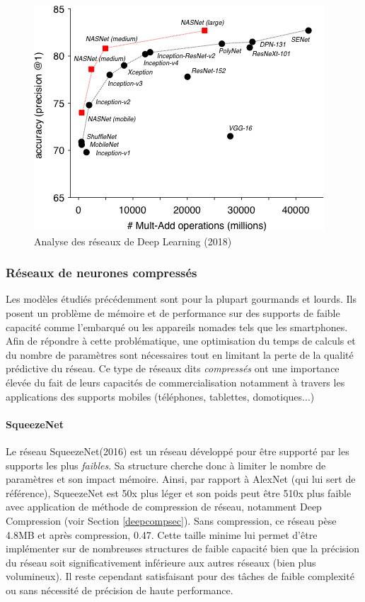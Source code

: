 \begin{figure}
    \centering
    \includegraphics[scale=0.45]{./tex/convolution-network/classifier/nasnet.jpg}
    \caption{Analyse des réseaux de Deep Learning (2018)}
    \label{ranking}
\end{figure}

\subsubsection{Réseaux de neurones compressés}

Les modèles étudiés précédemment sont pour la plupart gourmands et lourds. Ils posent un problème de mémoire et de performance sur des supports de faible capacité comme l'embarqué ou les appareils nomades tels que les smartphones. Afin de répondre à cette problématique, une optimisation du temps de calculs et du nombre de paramètres sont nécessaires tout en limitant la perte de la qualité prédictive du réseau. Ce type de réseaux dits \textit{compressés} ont une importance élevée du fait de leurs capacités de commercialisation notamment à travers les applications des supports mobiles (téléphones, tablettes, domotiques...)

\paragraph{SqueezeNet}
\label{squeezesect}
Le réseau SqueezeNet\cite{squeezenet}(2016) est un réseau développé pour être supporté par les supports les plus \textit{faibles}. Sa structure cherche donc à limiter le nombre de paramètres et son impact mémoire. Ainsi, par rapport à AlexNet (qui lui sert de référence), SqueezeNet est 50x plus léger et son poids peut être 510x plus faible avec application de méthode de compression de réseau, notamment Deep Compression (voir Section \ref{deepcompsec}). Sans compression, ce réseau pèse 4.8MB et après compression, 0.47. Cette taille minime lui permet d'être implémenter sur de nombreuses structures de faible capacité bien que la précision du réseau soit significativement inférieure aux autres réseaux (bien plus volumineux). Il reste cependant satisfaisant pour des tâches de faible complexité ou sans nécessité de précision de haute performance.\\

